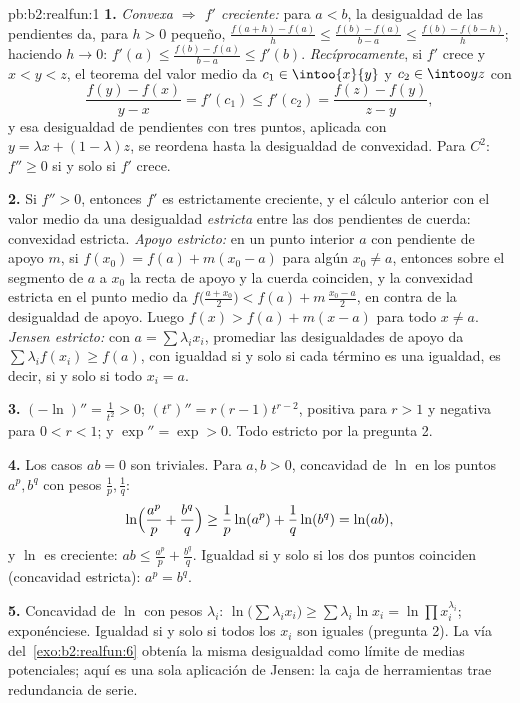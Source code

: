 \begin{solution}{pb:b2:realfun:1}
\textbf{1.} \emph{Convexa $\Rightarrow$ $f'$ creciente:} para $a <
b$, la desigualdad de las pendientes da, para $h > 0$ pequeño,
$\frac{f(a+h) - f(a)}h \leq \frac{f(b) - f(a)}{b-a} \leq \frac{f(b)
- f(b-h)}{h}$; haciendo $h \to 0$: $f'(a) \leq \frac{f(b) -
f(a)}{b - a} \leq f'(b)$. \emph{Recíprocamente}, si $f'$ crece y
$x < y < z$, el teorema del valor medio da $c_1 \in \intoo{x}{y}$
y $c_2 \in \intoo yz$ con
\[
\frac{f(y) - f(x)}{y - x} = f'(c_1) \leq f'(c_2)
= \frac{f(z) - f(y)}{z - y},
\]
y esa desigualdad de pendientes con tres puntos, aplicada con $y =
\lambda x + (1 - \lambda)z$, se reordena hasta la desigualdad de
convexidad. Para $C^2$: $f'' \geq 0$ si y solo si $f'$ crece.

\textbf{2.} Si $f'' > 0$, entonces $f'$ es estrictamente creciente,
y el cálculo anterior con el valor medio da una desigualdad
\emph{estricta} entre las dos pendientes de cuerda: convexidad
estricta. \emph{Apoyo estricto:} en un punto interior $a$ con
pendiente de apoyo $m$, si $f(x_0) = f(a) + m(x_0 - a)$ para algún
$x_0 \neq a$, entonces sobre el segmento de $a$ a $x_0$ la recta de
apoyo y la cuerda coinciden, y la convexidad estricta en el punto
medio da $f\bigl(\frac{a + x_0}2\bigr) < f(a) + m\,\frac{x_0 -
a}2$, en contra de la desigualdad de apoyo. Luego $f(x) > f(a) +
m(x - a)$ para todo $x \neq a$. \emph{Jensen estricto:} con $a =
\sum\lambda_ix_i$, promediar las desigualdades de apoyo da
$\sum\lambda_if(x_i) \geq f(a)$, con igualdad si y solo si cada
término es una igualdad, es decir, si y solo si todo $x_i = a$.

\textbf{3.} $(-\ln)'' = \frac1{t^2} > 0$; $(t^r)'' = r(r -
1)t^{r-2}$, positiva para $r > 1$ y negativa para $0 < r < 1$; y
$\exp'' = \exp > 0$. Todo estricto por la pregunta 2.

\textbf{4.} Los casos $ab = 0$ son triviales. Para $a, b > 0$,
concavidad de $\ln$ en los puntos $a^p, b^q$ con pesos $\frac1p,
\frac1q$:
\[
\ln\Bigl(\frac{a^p}p + \frac{b^q}q\Bigr) \geq
\frac1p\ln(a^p) + \frac1q\ln(b^q) = \ln(ab),
\]
y $\ln$ es creciente: $ab \leq \frac{a^p}p + \frac{b^q}q$. Igualdad
si y solo si los dos puntos coinciden (concavidad estricta): $a^p =
b^q$.

\textbf{5.} Concavidad de $\ln$ con pesos $\lambda_i$:
$\ln\bigl(\sum\lambda_ix_i\bigr) \geq \sum\lambda_i\ln x_i =
\ln\prod x_i^{\lambda_i}$; exponénciese. Igualdad si y solo si todos
los $x_i$ son iguales (pregunta 2). La vía del~\cref{exo:b2:realfun:6} obtenía la misma desigualdad como límite de
medias potenciales; aquí es una sola aplicación de Jensen: la caja
de herramientas trae redundancia de serie.


\end{solution}
